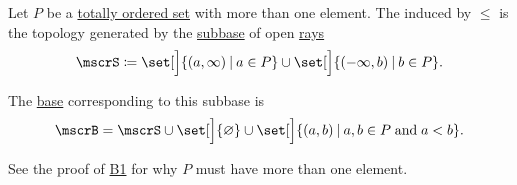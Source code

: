 \begin{definition}\label{def:order_topology}
  Let \( P \) be a \hyperref[def:partially_ordered_set]{totally ordered set} with more than one element. The  induced by \( \leq \) is the topology generated by the \hyperref[def:topological_subbase]{subbase} of open \hyperref[def:order_interval/ray]{rays}
  \begin{equation}\label{eq:def:order_topology/subbase}
    \mscrS \coloneqq \set[\Big]{ (a, \infty) \given a \in P } \cup \set[\Big]{ (-\infty, b) \given b \in P }.
  \end{equation}

  The \hyperref[def:topological_base]{base} corresponding to this subbase is
  \begin{equation}\label{eq:def:order_topology/base}
    \mscrB = \mscrS \cup \set[\Big]{ \varnothing } \cup \set[\Big]{ (a, b) \given a, b \in P \T{and} a < b }.
  \end{equation}

  See the proof of \hyperref[thm:topology_from_base/B1]{B1} for why \( P \) must have more than one element.
\end{definition}
